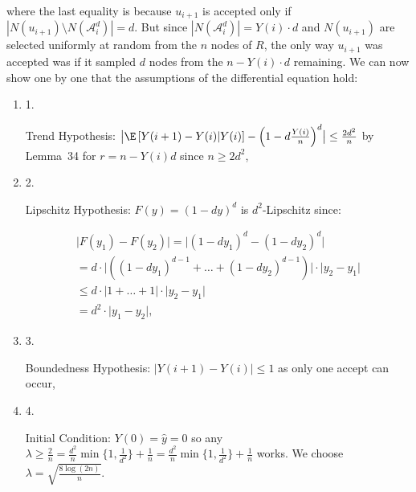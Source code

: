 where the last equality is because $u_{i+1}$ is accepted only if $|N(u_{i+1})\setminus N(\mathcal{A}^{d}_{i})|=d$. But since $|N(\mathcal{A}^{d}_{i})|=Y(i)\cdot d$ and $N(u_{i+1})$ are selected uniformly at random from the $n$ nodes of $R$, the only way $u_{i+1}$ was accepted was if it sampled $d$ nodes from the $n-Y(i)\cdot d$ remaining.
We can now show one by one that the assumptions of the differential equation hold:\par


\begin{enumerate}


\item[] 1. 


Trend Hypothesis: $\bigl|\E\left[Y(i+1)-Y(i)\middle|Y(i)\right]-\left(1-d\frac{Y(i)}{n}\right)^{d}\bigr|\leq\frac{2d^{2}}{n}$ by Lemma 34 for $r=n-Y(i)d$ since $n\geq 2d^{2}$,\par




\item[] 2. 


Lipschitz Hypothesis: $F(y)=\left(1-dy\right)^{d}$ is $d^{2}$-Lipschitz since:\par


\[\begin{gathered}
\displaystyle\bigl|F(y_{1})-F(y_{2})\bigr| \displaystyle=\bigl|\left(1-dy_{1}\right)^{d}-\left(1-dy_{2}\right)^{d}\bigr| \\
\displaystyle=d\cdot\bigl|\left(\left(1-dy_{1}\right)^{d-1}+\dots+\left(1-dy_{2}\right)^{d-1}\right)\bigr|\cdot\bigl|y_{2}-y_{1}\bigr| \\
\displaystyle\leq d\cdot\bigl|1+\dots+1\bigr|\cdot\bigl|y_{2}-y_{1}\bigr| \\
\displaystyle=d^{2}\cdot\bigl|y_{1}-y_{2}\bigr|,
\end{gathered}\]




\item[] 3. 


Boundedness Hypothesis: $\bigl|Y(i+1)-Y(i)\bigr|\leq 1$ as only one accept can occur,\par




\item[] 4. 


Initial Condition: $Y(0)=\hat{y}=0$ so any $\lambda\geq\frac{2}{n}=\frac{d^{2}}{n}\min\{1,\frac{1}{d^{2}}\}+\frac{1}{n}=\frac{d^{2}}{n}\min\{1,\frac{1}{d^{2}}\}+\frac{1}{n}$ works. We choose $\lambda=\sqrt{\frac{8\log{(2n)}}{n}}$.\par




\end{enumerate}




